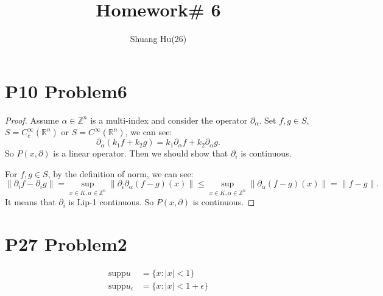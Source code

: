 \documentclass[a4paper]{ctexart}
\title{Homework\# 6}
\author{Shuang Hu(26)}
\begin{document}
\maketitle
\section*{P10 Problem6}
\begin{proof}
    Assume $\alpha\in\mathbb{Z}^{n}$ is a multi-index and consider the operator $\partial_{\alpha}$. Set $f,g\in S$, $S=C_{c}^{\infty}(\mathbb{R}^{n})$ or $S=C^{\infty}(\mathbb{R}^{n})$, we can see:
    \begin{equation}
        \partial_{\alpha}(k_{1}f+k_{2}g)=k_{1}\partial_{\alpha}f+k_{2}\partial_{\alpha}g.
    \end{equation}
    So $P(x,\partial)$ is a linear operator. Then we should show that $\partial_{i}$ is continuous.

    For $f,g\in S$, by the definition of norm, we can see:
    \begin{equation}
        \|\partial_{i}f-\partial_{i}g\|=\sup_{x\in K,\alpha\in\mathbb{Z}^{n}}\|\partial_{i}\partial_{\alpha}(f-g)(x)\|\le\sup_{x\in K,\alpha\in\mathbb{Z}^{n}}\|\partial_{\alpha}(f-g)(x)\|=\|f-g\|.
    \end{equation}
    It means that $\partial_{i}$ is Lip-1 continuous. So $P(x,\partial)$ is continuous.
\end{proof}
\section*{P27 Problem2}
\begin{equation}
    \begin{aligned}
    \text{supp}u&=\{x:|x|<1\}\\
    \text{supp}u_{\epsilon}&=\{x:|x|<1+\epsilon\}
    \end{aligned}
\end{equation}
\end{document}
